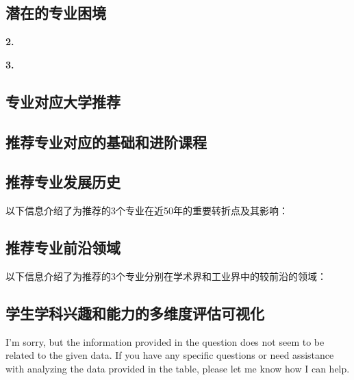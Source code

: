 \documentclass[12pt]{article}
\begin{document}
\begin{CJK*}{UTF8}{gbsn}
   \subsection*{潜在的专业困境}\textbf{2.} %




   \textbf{3.}

   \newpage
   \subsection*{专业对应大学推荐}


   \newpage
   \subsection*{推荐专业对应的基础和进阶课程}
   
   \newpage
   \subsection*{推荐专业发展历史}
   以下信息介绍了为推荐的3个专业在近50年的重要转折点及其影响：

   \newpage
   \subsection*{推荐专业前沿领域}
   以下信息介绍了为推荐的3个专业分别在学术界和工业界中的较前沿的领域：

   \newpage
   \subsection*{学生学科兴趣和能力的多维度评估可视化}
   I'm sorry, but the information provided in the question does not seem to be related to the given data. If you have any specific questions or need assistance with analyzing the data provided in the table, please let me know how I can help.
   

\end{CJK*}
\end{document}

